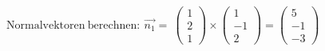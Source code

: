 \documentclass[preview]{standalone}
\begin{document}
\begin{center}
$\mathrm{Normalvektoren \: berechnen: } \: \vec{n_1} = \:\begin{pmatrix} 1 \\ 2 \\ 1 \end{pmatrix} \times \begin{pmatrix} 1 \\ -1 \\ 2 \end{pmatrix} = \begin{pmatrix} 5 \\ -1 \\ -3 \end{pmatrix}$
\end{center}
\end{document}
